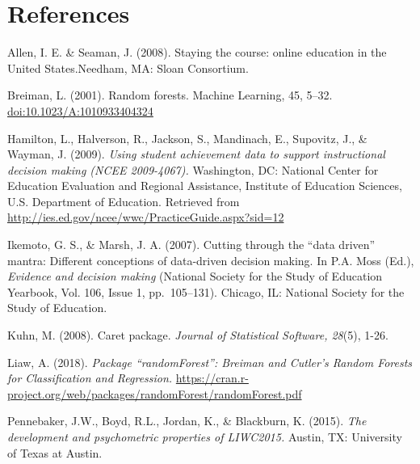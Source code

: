 \documentclass[acmart]{apa6}
\theoremstyle{definition}
\theoremstyle{definition}
\theoremstyle{definition}
\theoremstyle{remark}
\begin{document}
\newpage

\section{References}\label{references}

Allen, I. E. \& Seaman, J. (2008). Staying the course: online education
in the United States.Needham, MA: Sloan Consortium.

Breiman, L. (2001). Random forests. Machine Learning, 45, 5--32.
\url{doi:10.1023/A:1010933404324}

Hamilton, L., Halverson, R., Jackson, S., Mandinach, E., Supovitz, J.,
\& Wayman, J. (2009). \emph{Using student achievement data to support
instructional decision making (NCEE 2009-4067).} Washington, DC:
National Center for Education Evaluation and Regional Assistance,
Institute of Education Sciences, U.S. Department of Education. Retrieved
from \url{http://ies.ed.gov/ncee/wwc/PracticeGuide.aspx?sid=12}

Ikemoto, G. S., \& Marsh, J. A. (2007). Cutting through the
\enquote{data driven} mantra: Different conceptions of data-driven
decision making. In P.A. Moss (Ed.), \emph{Evidence and decision making}
(National Society for the Study of Education Yearbook, Vol. 106, Issue
1, pp.~105--131). Chicago, IL: National Society for the Study of
Education.

Kuhn, M. (2008). Caret package. \emph{Journal of Statistical Software,
28}(5), 1-26.

Liaw, A. (2018). \emph{Package \enquote{randomForest}: Breiman and
Cutler's Random Forests for Classification and Regression.}
\url{https://cran.r-project.org/web/packages/randomForest/randomForest.pdf}

Pennebaker, J.W., Boyd, R.L., Jordan, K., \& Blackburn, K. (2015).
\emph{The development and psychometric properties of LIWC2015.} Austin,
TX: University of Texas at Austin.

\begingroup
\setlength{\parindent}{-0.5in} \setlength{\leftskip}{0.5in}

\hypertarget{refs}{}

\endgroup
\end{document}
